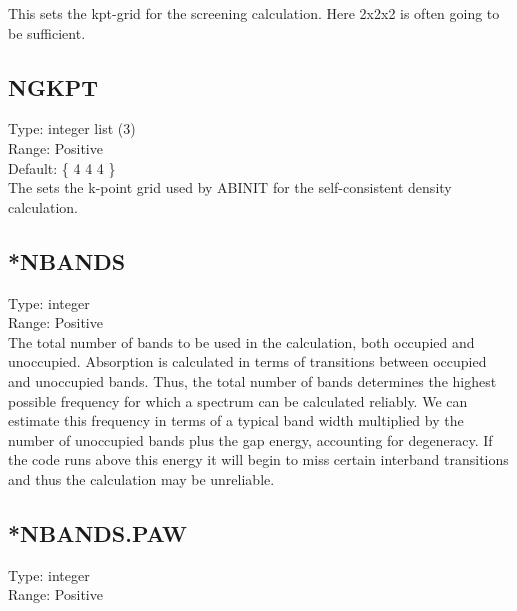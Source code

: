 \documentclass[12pt]{article}
\begin{document}
This sets the kpt-grid for the screening calculation. Here 2x2x2 is often going to be sufficient.




\subsection{NGKPT}
Type: integer list (3) \\
Range: Positive \\
Default: \{ 4 4 4 \} \\

The sets the k-point grid used by ABINIT for the self-consistent density calculation.


\subsection{*NBANDS}
Type: integer \\
Range: Positive \\

The total number of bands to be used in the calculation, both occupied and unoccupied.
Absorption is calculated in terms of transitions between occupied and 
unoccupied bands. Thus, the total number of bands determines the highest 
possible frequency for which a spectrum can be calculated reliably. We can
estimate this frequency in terms of a typical band width multiplied by the number of
unoccupied bands plus the gap energy, accounting for degeneracy. If the code runs above this energy it 
will begin to miss certain interband transitions and thus the calculation
may be unreliable.

\subsection{*NBANDS.PAW}
Type: integer \\
Range: Positive \\
\end{document}
